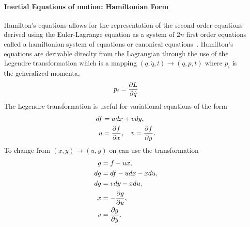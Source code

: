 \paragraph{Inertial Equations of motion: Hamiltonian Form}\label{sec:inertial_hamiltonian_form}
Hamilton's equations allows for the representation of the second order equations derived using the Euler-Lagrange equation as a system of \( 2n \) first order equations called a hamiltonian system of equations or canonical equations~\cite{arnold1989}.
Hamilton's equations are derivable direclty from the Lagrangian through the use of the Legendre transformation which is a mapping \( \left( q, \dot{q},t\right) \rightarrow \left(q, p, t \right) \) where \( p_i\) is the generalized momenta,
\begin{align}\label{eq:legendre_transform}
	p_i = \frac{\partial L}{\partial \dot{q}}
\end{align}
The Legendre transformation is useful for variational equations of the form
\begin{align*}
	df &= u dx + v dy, \\
	u &= \frac{\partial f}{\partial x},\quad v = \frac{\partial f}{\partial y}.
\end{align*}
To change from \( \left( x, y\right) \rightarrow \left(u,y \right) \) on can use the transformation
\begin{align*}
	g &= f - u x,\\
	dg &= df - u dx - x du, \\
	dg &= v dy - x du, \\
	x&= -\frac{\partial g}{\partial u}, \\
    v&= \frac{\partial g}{\partial y}.
\end{align*}

